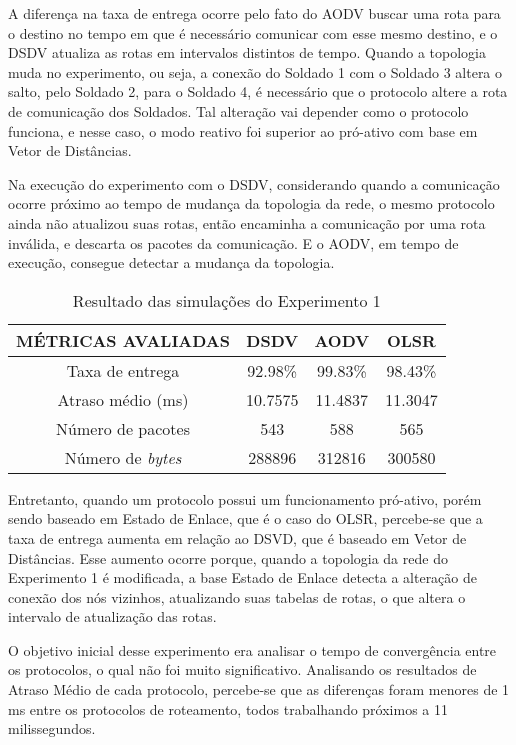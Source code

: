 A diferen\c{c}a na taxa de entrega ocorre pelo fato do AODV buscar uma rota para o destino no tempo em que \'e necess\'ario comunicar com esse mesmo destino, e o DSDV atualiza as rotas em intervalos distintos de tempo.
Quando a topologia muda no experimento, ou seja, a conex\~ao do Soldado 1 com o Soldado 3 altera o salto, pelo Soldado 2, para o Soldado 4, \'e necess\'ario que o protocolo altere a rota de comunica\c{c}\~ao dos Soldados.
Tal altera\c{c}\~ao vai depender como o protocolo funciona, e nesse caso, o modo reativo foi superior ao pr\'o-ativo com base em Vetor de Dist\^ancias.

Na execu\c{c}\~ao do experimento com o DSDV, considerando quando a comunica\c{c}\~ao ocorre pr\'oximo ao tempo de mudan\c{c}a da topologia da rede, o mesmo protocolo ainda n\~ao atualizou suas rotas, ent\~ao encaminha a comunica\c{c}\~ao por uma rota inv\'alida, e descarta os pacotes da comunica\c{c}\~ao. E o AODV, em tempo de execu\c{c}\~ao, consegue detectar a mudan\c{c}a da topologia.

\begin{table}[H]
	\centering
	\caption{Resultado das simula\c{c}\~oes do Experimento 1}
	\begin{tabular}{ | c | c | c | c | }
		\hline
		M\'ETRICAS AVALIADAS & DSDV & AODV & OLSR \\ \hline
		Taxa de entrega & 92.98\% & 99.83\% & 98.43\% \\ \hline
		Atraso m\'edio (ms) & 10.7575 & 11.4837 & 11.3047 \\ \hline
		N\'umero de pacotes & 543 & 588 & 565 \\ \hline
		N\'umero de \textit{bytes} & 288896 & 312816 & 300580 \\ \hline
	\end{tabular}
	\label{tabExp1Result}
\end{table}

Entretanto, quando um protocolo possui um funcionamento pr\'o-ativo, por\'em sendo baseado em Estado de Enlace, que \'e o caso do OLSR, percebe-se que a taxa de entrega aumenta em rela\c{c}\~ao ao DSVD, que \'e baseado em Vetor de Dist\^ancias.
Esse aumento ocorre porque, quando a topologia da rede do Experimento 1 \'e modificada, a base Estado de Enlace detecta a altera\c{c}\~ao de conex\~ao dos n\'os vizinhos, atualizando suas tabelas de rotas, o que altera o intervalo de atualiza\c{c}\~ao das rotas.

O objetivo inicial desse experimento era analisar o tempo de converg\^encia entre os protocolos, o qual n\~ao foi muito significativo.
Analisando os resultados de Atraso M\'edio de cada protocolo, percebe-se que as diferen\c{c}as foram menores de 1 ms entre os protocolos de roteamento, todos trabalhando pr\'oximos a 11 milissegundos.


